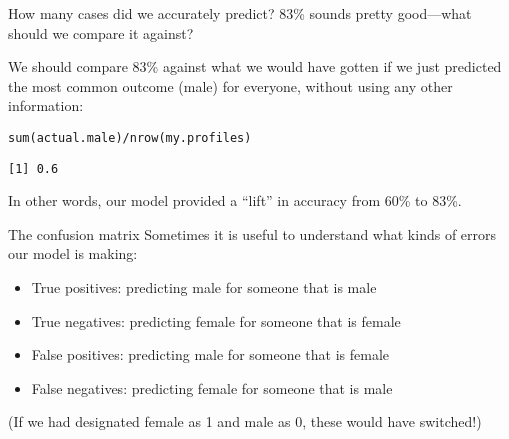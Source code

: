\documentclass{beamer}\usepackage[]{graphicx}\usepackage[]{color}
\makeatletter
\newcommand{\hlopt}[1]{\textcolor[rgb]{1,0.894,0.769}{#1}}%
\newcommand{\hlstd}[1]{\textcolor[rgb]{1,0.894,0.769}{#1}}%
\newcommand{\hlkwd}[1]{\textcolor[rgb]{1,0.78,0.769}{#1}}%
\newenvironment{kframe}{%
 \def\at@end@of@kframe{}%
 \ifinner\ifhmode%
  \def\at@end@of@kframe{\end{minipage}}%
  \begin{minipage}{\columnwidth}%
 \fi\fi%
 \def\FrameCommand##1{\hskip\@totalleftmargin \hskip-\fboxsep
 \colorbox{shadecolor}{##1}\hskip-\fboxsep
     \hskip-\linewidth \hskip-\@totalleftmargin \hskip\columnwidth}%
 \MakeFramed {\advance\hsize-\width
   \@totalleftmargin\z@ \linewidth\hsize
   \@setminipage}}%
 {\par\unskip\endMakeFramed%
 \at@end@of@kframe}
\newenvironment{knitrout}{}{} %
\makeatother
\begin{document}
\begin{darkframes}
    \begin{frame}[fragile]{How many cases did we accurately predict?}
      83\% sounds pretty good---what should we compare it against?

      \bigskip
      \pause

      We should compare 83\% against what we would have gotten if we just predicted the most common outcome (male) for everyone, without using any other information:
      \pause

\begin{knitrout}
\begin{kframe}
\begin{alltt}
\hlkwd{sum}\hlstd{(actual.male)} \hlopt{/} \hlkwd{nrow}\hlstd{(my.profiles)}
\end{alltt}
\begin{verbatim}
[1] 0.6
\end{verbatim}
\end{kframe}
\end{knitrout}

      \pause

      In other words, our model provided a ``lift'' in accuracy from 60\% to 83\%.
    \end{frame}

    \begin{frame}{The confusion matrix}
      Sometimes it is useful to understand what kinds of errors our model is making:
      \begin{itemize}
        \item \alert{True positives}: predicting male for someone that is male
        \item \alert{True negatives}: predicting female for someone that is female
        \item \alert{False positives}: predicting male for someone that is female
        \item \alert{False negatives}: predicting female for someone that is male
      \end{itemize}
      (If we had designated female as 1 and male as 0, these would have switched!)
    \end{frame}


\end{darkframes}
\end{document}
